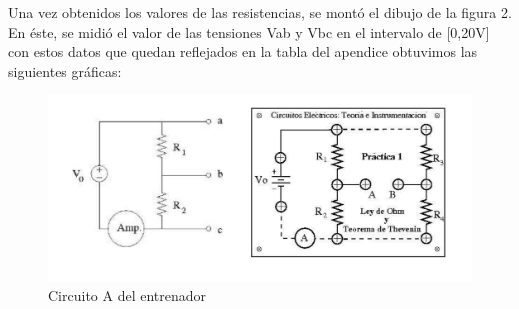 \documentclass[a4paper,11pt]{article}
\begin{document}
Una vez obtenidos los valores de las resistencias, se montó el dibujo de la figura 2. En éste, se midió el valor de las tensiones Vab y Vbc en el intervalo de [0,20V] con estos datos que quedan reflejados en la tabla del apendice obtuvimos las siguientes gráficas:


\begin{figure}[hbtp]
\centering
\includegraphics[scale=0.5]{Imagenes/Entrenador.png}
\caption{Circuito A del entrenador}
\end{figure}
\end{document}
